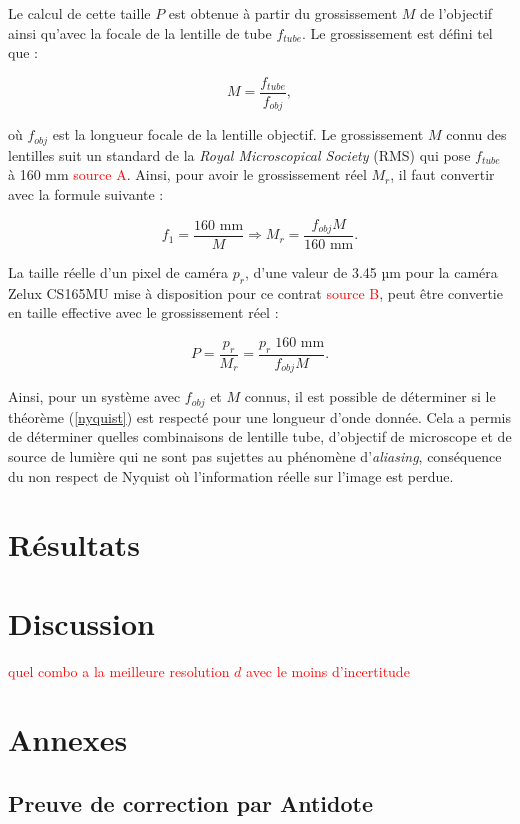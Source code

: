 \documentclass[conference]{IEEEtran}
\begin{document}
Le calcul de cette taille $P$ est obtenue à partir du grossissement $M$ de l'objectif ainsi qu'avec la
focale de la lentille de tube $f_{tube}$. Le grossissement est défini tel que :

\begin{equation}
  M = \frac{f_{tube}}{f_{obj}},
\end{equation}

où $f_{obj}$ est la longueur focale de la lentille objectif. Le grossissement $M$ connu des lentilles suit
un standard de la \textit{Royal Microscopical Society} (RMS) qui pose $f_{tube}$ à 160 mm
\textcolor{red}{source A}. Ainsi, pour avoir le grossissement réel $M_{r}$, il faut convertir avec la 
formule suivante :


\begin{equation}
  f_{1}= \frac{160 \text{ mm} }{M} \Rightarrow M_{r} = \frac{f_{obj}M}{160 \text{ mm} }.
\end{equation}

La taille réelle d'un pixel de caméra $p_r$, d'une valeur de 3.45 µm pour la caméra Zelux CS165MU
mise à disposition pour ce contrat \textcolor{red}{source B}, peut être convertie en taille effective
avec le grossissement réel :

\begin{equation}
  P = \frac{p_{r}}{M_{r}} = \frac{p_{r}\;160 \text{ mm}}{f_{obj}M}.
\end{equation}

Ainsi, pour un système avec $f_{obj}$ et $M$ connus, il est possible de déterminer si le théorème 
(\ref{nyquist}) est respecté pour une longueur d'onde donnée. Cela a permis de déterminer quelles 
combinaisons de lentille tube, d'objectif de microscope et de source de lumière qui ne sont pas 
sujettes au phénomène d'\textit{aliasing}, conséquence du non respect de Nyquist où l'information
réelle sur l'image est perdue.


\section{Résultats \label{resultats}}



\section{Discussion}

\textcolor{red}{quel combo a la meilleure resolution $d$ avec le moins d'incertitude}


\clearpage

\section{Annexes}

\subsection{Preuve de correction par Antidote}

\clearpage
\end{document}
